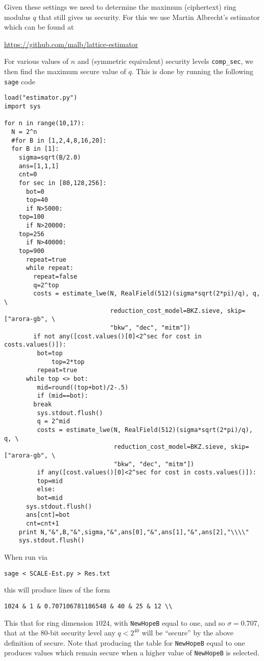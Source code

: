 Given these settings we need to determine the maximum
(ciphertext) ring modulus $q$ that still gives us security.
For this we use Martin Albrecht's estimator which can
be found at
\begin{center}
  \url{https://github.com/malb/lattice-estimator}
\end{center}
For various values of $n$ and (symmetric equivalent)
security levels \verb+comp_sec+, we then find the maximum secure
value of $q$.
This is done by running the following \verb+sage+ code
\begin{verbatim}
load("estimator.py")
import sys

for n in range(10,17):
  N = 2^n
  #for B in [1,2,4,8,16,20]:
  for B in [1]:
    sigma=sqrt(B/2.0)
    ans=[1,1,1]
    cnt=0
    for sec in [80,128,256]:
      bot=0
      top=40
      if N>5000:
	top=100
      if N>20000:
	top=256
      if N>40000:
	top=900
      repeat=true
      while repeat:
        repeat=false
        q=2^top
        costs = estimate_lwe(N, RealField(512)(sigma*sqrt(2*pi)/q), q, \
                             reduction_cost_model=BKZ.sieve, skip=["arora-gb", \
                             "bkw", "dec", "mitm"])
        if not any([cost.values()[0]<2^sec for cost in costs.values()]):
	     bot=top
             top=2*top
	     repeat=true
      while top <> bot:
         mid=round((top+bot)/2-.5)
         if (mid==bot):
		break
         sys.stdout.flush()
         q = 2^mid
         costs = estimate_lwe(N, RealField(512)(sigma*sqrt(2*pi)/q), q, \
                              reduction_cost_model=BKZ.sieve, skip=["arora-gb", \
                              "bkw", "dec", "mitm"])
         if any([cost.values()[0]<2^sec for cost in costs.values()]):
	     top=mid
         else:
	     bot=mid
      sys.stdout.flush()
      ans[cnt]=bot
      cnt=cnt+1
    print N,"&",B,"&",sigma,"&",ans[0],"&",ans[1],"&",ans[2],"\\\\"
    sys.stdout.flush()
\end{verbatim}
When run via
\begin{center}
  \verb+sage < SCALE-Est.py > Res.txt+
\end{center}
this will produce lines of the form
\begin{center}
  \verb+1024 & 1 & 0.707106781186548 & 40 & 25 & 12 \\+
\end{center}
This that for ring dimension $1024$, with \verb+NewHopeB+ equal to
one, and so $\sigma=0.707$, that at the 80-bit security level any $q < 2^{40}$ will
be ``secure'' by the above definition of secure.
Note that producing the table for \verb+NewHopeB+ equal to one produces
values which remain secure when a higher value of \verb+NewHopeB+ is selected.

